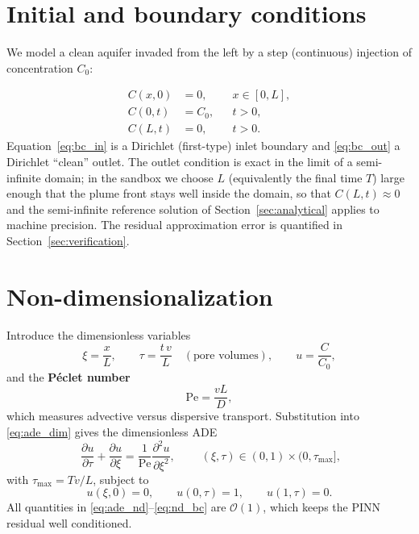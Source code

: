 \documentclass[11pt]{article}
\newcommand{\pdd}[2]{\frac{\partial #1}{\partial #2}}
\newcommand{\pddt}[2]{\frac{\partial^{2} #1}{\partial #2^{2}}}
\begin{document}
\section{Initial and boundary conditions}
\label{sec:bc}

We model a clean aquifer invaded from the left by a step (continuous) injection
of concentration $C_0$:

\begin{subequations}
\label{eq:icbc}
\begin{align}
C(x,0) &= 0, && x\in[0,L], \label{eq:ic}\\[2pt]
C(0,t) &= C_0, && t>0, \label{eq:bc_in}\\[2pt]
C(L,t) &= 0, && t>0. \label{eq:bc_out}
\end{align}
\end{subequations}
Equation~\eqref{eq:bc_in} is a Dirichlet (first-type) inlet boundary and
\eqref{eq:bc_out} a Dirichlet ``clean'' outlet. The outlet condition is exact in
the limit of a semi-infinite domain; in the sandbox we choose $L$ (equivalently
the final time $T$) large enough that the plume front stays well inside the
domain, so that $C(L,t)\approx 0$ and the semi-infinite reference solution of
Section~\ref{sec:analytical} applies to machine precision. The residual
approximation error is quantified in Section~\ref{sec:verification}.

\section{Non-dimensionalization}
\label{sec:nondim1d}

Introduce the dimensionless variables
\begin{equation}
\xi=\frac{x}{L},\qquad
\tau=\frac{t\,v}{L}\quad(\text{pore volumes}),\qquad
u=\frac{C}{C_0},
\end{equation}
and the \textbf{P\'eclet number}
\begin{equation}
\label{eq:pe}
\mathrm{Pe}=\frac{vL}{D},
\end{equation}
which measures advective versus dispersive transport. Substitution into
\eqref{eq:ade_dim} gives the dimensionless ADE
\begin{equation}
\label{eq:ade_nd}
\boxed{\;
\pdd{u}{\tau}+\pdd{u}{\xi}=\frac{1}{\mathrm{Pe}}\pddt{u}{\xi},
\;}
\qquad (\xi,\tau)\in(0,1)\times(0,\tau_{\max}],
\end{equation}
with $\tau_{\max}=Tv/L$, subject to
\begin{equation}
u(\xi,0)=0,\qquad u(0,\tau)=1,\qquad u(1,\tau)=0 .
\label{eq:nd_bc}
\end{equation}
All quantities in \eqref{eq:ade_nd}--\eqref{eq:nd_bc} are $\mathcal{O}(1)$,
which keeps the PINN residual well conditioned.
\end{document}
